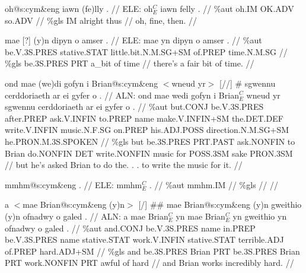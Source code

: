 \documentclass[a4paper,10pt]{article}
\begin{document}
\ex
\begingl[lingstyle=gergl]
\glchat oh@s:cym\&eng iawn (fe)lly . //
\glsurface ELE:  oh$^{C}_{E}$ iawn felly .  //
\glauto \%aut  oh{\scriptsize .IM} OK{\scriptsize .ADV} so{\scriptsize .ADV}   //
\glmanual \%gls  IM alright thus   //
\gleng oh, fine, then. //
\endgl
\xe

\ex
\begingl[lingstyle=gergl]
\glchat mae [?] (y)n dipyn o amser . //
\glsurface ELE:  mae yn dipyn o amser .  //
\glauto \%aut  be{\scriptsize .V.3S.PRES} stative{\scriptsize .STAT} little{\scriptsize .bit.N.M.SG+SM} of{\scriptsize .PREP} time{\scriptsize .N.M.SG}   //
\glmanual \%gls  be{\scriptsize .3S.PRES} PRT a\_bit of time   //
\gleng there's a fair bit of time. //
\endgl
\xe

\ex
\begingl[lingstyle=gergl]
\glchat ond mae (we)di gofyn i Brian@s:cym\&eng $<$wneud yr$>$ [//] \# sgwennu cerddoriaeth ar ei gyfer o . //
\glsurface ALN:  ond mae wedi gofyn i Brian$^{C}_{E}$ wneud yr sgwennu cerddoriaeth ar ei gyfer o .  //
\glauto \%aut  but{\scriptsize .CONJ} be{\scriptsize .V.3S.PRES} after{\scriptsize .PREP} ask{\scriptsize .V.INFIN} to{\scriptsize .PREP} name make{\scriptsize .V.INFIN+SM} the{\scriptsize .DET.DEF} write{\scriptsize .V.INFIN} music{\scriptsize .N.F.SG} on{\scriptsize .PREP} his{\scriptsize .ADJ.POSS} direction{\scriptsize .N.M.SG+SM} he{\scriptsize .PRON.M.3S.SPOKEN}   //
\glmanual \%gls  but be{\scriptsize .3S.PRES} PRT{\scriptsize .PAST} ask{\scriptsize .NONFIN} to Brian do{\scriptsize .NONFIN} DET write{\scriptsize .NONFIN} music for POSS{\scriptsize .3SM} sake PRON{\scriptsize .3SM}   //
\gleng but he's asked Brian to do the. . . to write the music for it. //
\endgl
\xe

\ex
\begingl[lingstyle=gergl]
\glchat mmhm@s:cym\&eng . //
\glsurface ELE:  mmhm$^{C}_{E}$ .  //
\glauto \%aut  mmhm{\scriptsize .IM}   //
\glmanual \%gls     //
\gleng  //
\endgl
\xe

\ex
\begingl[lingstyle=gergl]
\glchat a $<$mae Brian@s:cym\&eng (y)n$>$ [/] \#\# mae Brian@s:cym\&eng (y)n gweithio (y)n ofnadwy o galed . //
\glsurface ALN:  a mae Brian$^{C}_{E}$ yn mae Brian$^{C}_{E}$ yn gweithio yn ofnadwy o galed .  //
\glauto \%aut  and{\scriptsize .CONJ} be{\scriptsize .V.3S.PRES} name in{\scriptsize .PREP} be{\scriptsize .V.3S.PRES} name stative{\scriptsize .STAT} work{\scriptsize .V.INFIN} stative{\scriptsize .STAT} terrible{\scriptsize .ADJ} of{\scriptsize .PREP} hard{\scriptsize .ADJ+SM}   //
\glmanual \%gls  and be{\scriptsize .3S.PRES} Brian PRT be{\scriptsize .3S.PRES} Brian PRT work{\scriptsize .NONFIN} PRT awful of hard   //
\gleng and Brian works incredibly hard. //
\endgl
\xe
\end{document}
